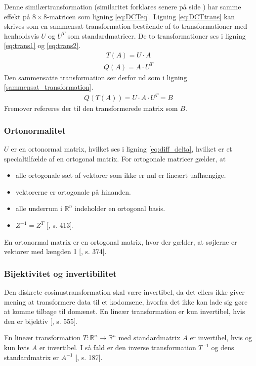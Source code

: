 Denne similærtransformation (similaritet forklares senere på side \pageref{sec:similaritet}) har samme effekt på $8\times8$-matricen som ligning \vref{eq:DCTeq}. Ligning \ref{eq:DCTtrans} kan skrives som en sammensat transformation bestående af to transformationer med henholdsvis $U$ og $U^T$ som standardmatricer. De to transformationer ses i ligning \ref{eq:trans1} og \ref{eq:trans2}.
\begin{align}
T(A)=U \cdot A
\label{eq:trans1}
\end{align}
\begin{align}
Q(A)=A \cdot U^T
\label{eq:trans2}
\end{align}
Den sammensatte transformation ser derfor ud som i ligning \ref{sammensat_transformation}.
\begin{align}
Q(T(A))=U \cdot A \cdot U^T=B
\label{sammensat_transformation}
\end{align}
Fremover refereres der til den transformerede matrix som $B$.
\subsubsection*{Ortonormalitet}\label{sec:ortonormalitet}
$U$ er en ortonormal matrix, hvilket ses i ligning \vref{eq:diff_delta}, hvilket er et specialtilfælde af en ortogonal matrix. For ortogonale matricer gælder, at
\begin{itemize}
	\item{alle ortogonale sæt af vektorer som ikke er nul er lineært uafhængige.}
	\item{vektorerne er ortogonale på hinanden.}
	\item{alle underrum i $\mathbb{R}^n$ indeholder en ortogonal basis.}
	\item{$Z^{-1} = Z^T$ [\citet{linalg}, s. 413].}
\end{itemize}
En ortonormal matrix er en ortogonal matrix, hvor der gælder, at søjlerne er vektorer med længden 1 [\citet{linalg}, s. 374].
\subsubsection*{Bijektivitet og invertibilitet}
Den diskrete cosinustransformation skal være invertibel, da det ellers ikke giver mening at transformere data til et kodomæne, hvorfra det ikke kan lade sig gøre at komme tilbage til domænet. En lineær transformation er kun invertibel, hvis den er bijektiv [\citet{linalg}, s. 555].

En lineær transformation $T:\mathbb{R}^n \longrightarrow \mathbb{R}^n$ med standardmatrix $A$ er invertibel, hvis og kun hvis $A$ er invertibel. I så fald er den inverse transformation $T^{-1}$ og dens standardmatrix er $A^{-1}$ [\citet{linalg}, s. 187].

